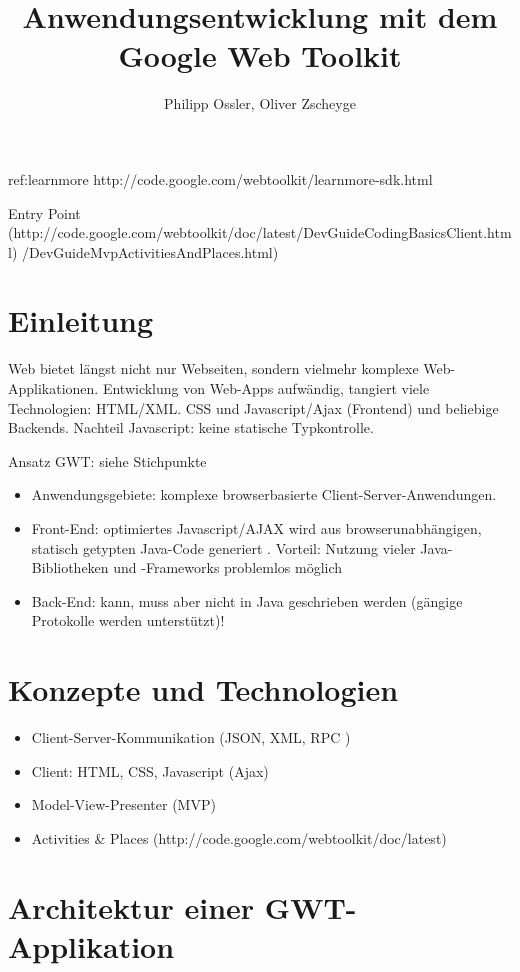 \documentclass[12pt, a4paper, ngerman]{article}
\author{Philipp Ossler, Oliver Zscheyge}
\title{Anwendungsentwicklung mit dem Google Web Toolkit}
\begin{document}
\pagestyle{plain}

ref:learnmore
http://code.google.com/webtoolkit/learnmore-sdk.html

Entry Point (http://code.google.com/webtoolkit/doc/latest/DevGuideCodingBasicsClient.html)
/DevGuideMvpActivitiesAndPlaces.html)

\section{Einleitung}

Web bietet längst nicht nur Webseiten, sondern vielmehr komplexe Web-Applikationen. Entwicklung von Web-Apps aufwändig, tangiert viele Technologien: HTML/XML. CSS und Javascript/Ajax (Frontend) und beliebige Backends. Nachteil Javascript: keine statische Typkontrolle.

Ansatz GWT: siehe Stichpunkte

\begin{itemize}
\item Anwendungsgebiete: komplexe browserbasierte Client-Server-Anwendungen.
\item Front-End: optimiertes Javascript/AJAX wird aus browserunabhängigen, statisch getypten Java-Code generiert \cite{ref:learnmore}. Vorteil: Nutzung vieler Java-Bibliotheken und -Frameworks problemlos möglich
\item Back-End: kann, muss aber nicht in Java geschrieben werden (gängige Protokolle werden unterstützt)!
\end{itemize}

\section{Konzepte und Technologien}
\begin{itemize}
\item Client-Server-Kommunikation (JSON, XML, RPC \cite{ref:learnmore})
\item Client: HTML, CSS, Javascript (Ajax)
\item Model-View-Presenter (MVP)
\item Activities & Places (http://code.google.com/webtoolkit/doc/latest)
\end{itemize}

\section{Architektur einer GWT-Applikation}
\end{document}
